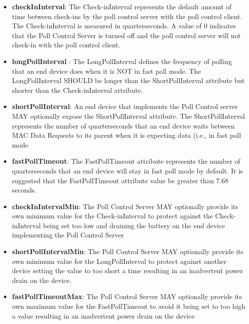 \begin{itemize}
\item \textbf{checkInInterval}: The Check-inInterval represents the default amount of time between check-ins by the poll control server with the poll control client. The Check-inInterval is measured in quarterseconds. A value of 0 indicates that the Poll Control Server is turned off and the poll control server will not check-in with the poll control client.
\item \textbf{longPollInterval    }: The LongPollInterval defines the frequency of polling that an end device does when it is NOT in fast poll mode. The LongPollInterval SHOULD be longer than the ShortPollInterval attribute but shorter than the Check-inInterval attribute.
\item \textbf{shortPollInterval}: An end device that implements the Poll Control server MAY optionally expose the ShortPollInterval attribute. The ShortPollInterval represents the number of quarterseconds that an end device waits between MAC Data Requests to its parent when it is expecting data (i.e., in fast poll mode
\item \textbf{fastPollTimeout}:     The FastPollTimeout attribute represents the number of quarterseconds that an end device will stay in fast poll mode by default. It is suggested that the FastPollTimeout attribute value be greater than 7.68 seconds.
\item \textbf{checkInIntervalMin}: The Poll Control Server MAY optionally provide its own minimum value for the Check-inInterval to protect against the Check-inInterval being set too low and draining the battery on the end device implementing the Poll Control Server
\item \textbf{shortPollIntervalMin}: The Poll Control Server MAY optionally provide its own minimum value for the LongPollInterval to protect against another device setting the value to too short a time resulting in an inadvertent power drain on the device.
\item \textbf{fastPollTimeoutMax}: The Poll Control Server MAY optionally provide its own maximum value for the FastPollTimeout to avoid it being set to too high a value resulting in an inadvertent power drain on the device
\end{itemize}

